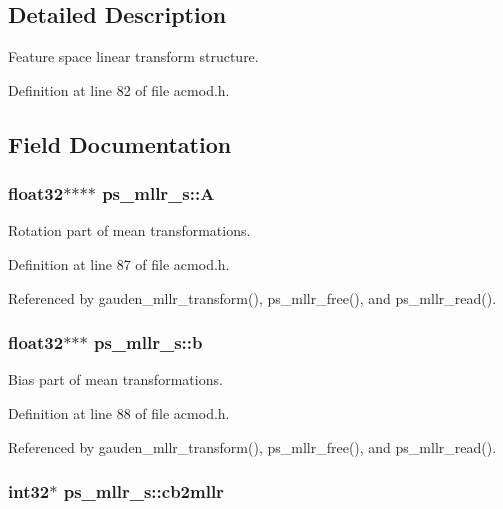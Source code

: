 \subsection{Detailed Description}
Feature space linear transform structure. 

Definition at line 82 of file acmod.\+h.



\subsection{Field Documentation}
\subsubsection[{A}]{\setlength{\rightskip}{0pt plus 5cm}float32$\ast$$\ast$$\ast$$\ast$ ps\+\_\+mllr\+\_\+s\+::\+A}\label{structps__mllr__s_a4cfa5d4c6637282b947b525a673cc3d0}


Rotation part of mean transformations. 



Definition at line 87 of file acmod.\+h.



Referenced by gauden\+\_\+mllr\+\_\+transform(), ps\+\_\+mllr\+\_\+free(), and ps\+\_\+mllr\+\_\+read().

\subsubsection[{b}]{\setlength{\rightskip}{0pt plus 5cm}float32$\ast$$\ast$$\ast$ ps\+\_\+mllr\+\_\+s\+::b}\label{structps__mllr__s_a65430ba654d0af5e508715de24077f2d}


Bias part of mean transformations. 



Definition at line 88 of file acmod.\+h.



Referenced by gauden\+\_\+mllr\+\_\+transform(), ps\+\_\+mllr\+\_\+free(), and ps\+\_\+mllr\+\_\+read().

\subsubsection[{cb2mllr}]{\setlength{\rightskip}{0pt plus 5cm}int32$\ast$ ps\+\_\+mllr\+\_\+s\+::cb2mllr}\label{structps__mllr__s_a745c4b69be55cef8629abab02f474bb9}


